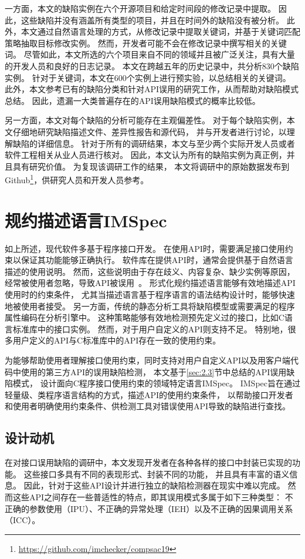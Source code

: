 一方面，本文的缺陷实例在六个开源项目和给定时间段的修改记录中提取。
因此，这些缺陷并没有涵盖所有类型的项目，并且在时间外的缺陷没有被分析。
此外，本文通过自然语言处理的方式，从修改记录中提取关键词，并基于关键词匹配策略抽取目标修改实例。
然而，开发者可能不会在修改记录中撰写相关的关键词。
尽管如此，本文所选的六个项目来自不同的领域并且被广泛关注，具有大量的开发人员和良好的日志记录。
本文在跨越五年的历史记录中，共分析830个缺陷实例。
针对于关键词，本文在600个实例上进行预实验，以总结相关的关键词。
此外，本文参考已有的缺陷分类和针对API误用的研究工作，从而帮助对缺陷模式总结。
因此，遗漏一大类普遍存在的API误用缺陷模式的概率比较低。

另一方面，本文对每个缺陷的分析可能存在主观偏差性。
对于每个缺陷实例，本文仔细地研究缺陷描述文件、差异性报告和源代码，
并与开发者进行讨论，以理解缺陷的详细信息。
针对于所有的调研结果，本文与至少两个实际开发人员或者软件工程相关从业人员进行核对。
因此，本文认为所有的缺陷实例为真正例，并且具有研究价值。
为复现该调研工作的结果，
本文将调研中的原始数据发布到Github\footnote{\url{https://github.com/imchecker/compsac19}}，供研究人员和开发人员参考。

\section{规约描述语言IMSpec}
\label{sec:2.4}
如上所述，现代软件多基于程序接口开发。
在使用API时，需要满足接口使用约束以保证其功能能够正确执行。
软件库在提供API时，通常会提供基于自然语言描述的使用说明。
然而，这些说明由于存在歧义、内容复杂、缺少实例等原因，经常被使用者忽略，导致API被误用~\cite{11-etaps-doc}。
形式化规约描述语言能够有效地描述API使用时的约束条件，
尤其当描述语言基于程序语言的语法结构设计时，能够快速地被使用者接受。
另一方面，传统的静态分析工具将缺陷模型或需要满足的程序属性编码在分析引擎中。
这种策略能够有效地检测预先定义过的接口，比如C语言标准库中的接口实例。
然而，对于用户自定义的API则支持不足。
特别地，很多用户定义的API与C标准库中的API存在一致的使用约束。

为能够帮助使用者理解接口使用约束，同时支持对用户自定义API以及用客户端代码中使用的第三方API的误用缺陷检测，
本文基于\ref{sec:2.3}节中总结的API误用缺陷模式，
设计面向C程序接口使用约束的领域特定语言IMSpec。
IMSpec旨在通过轻量级、类程序语言结构的方式，描述API的使用约束条件，
以帮助接口开发者和使用者明确使用约束条件、供检测工具对错误使用API导致的缺陷进行查找。

\subsection{设计动机}
在对接口误用缺陷的调研中，本文发现开发者在各种各样的接口中封装已实现的功能。
这些接口多具有不同的表现形式、封装不同的功能，
并且具有丰富的语义信息。
因此，针对于这些API设计并进行独立的缺陷检测器在现实中难以完成。
然而这些API之间存在一些普适性的特点，即其误用模式多属于如下三种类型：
不正确的参数使用（IPU）、不正确的异常处理（IEH）以及不正确的因果调用关系（ICC）。

